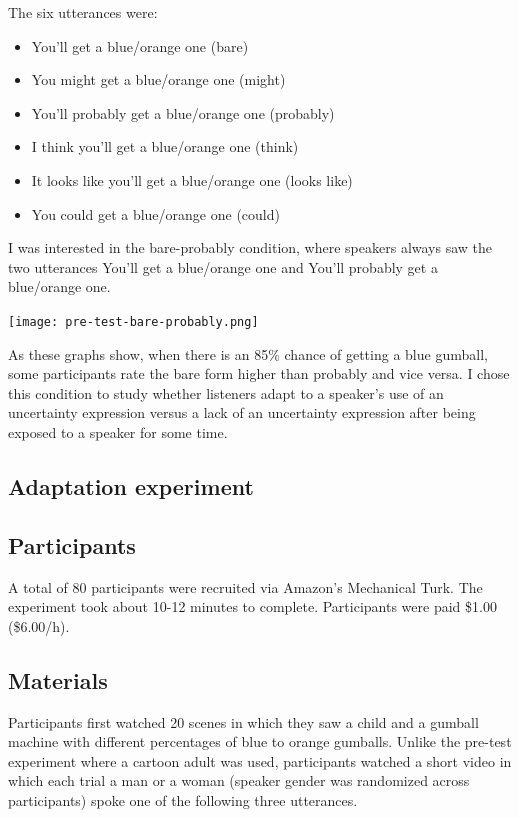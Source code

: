 \documentclass{sp}          %
\begin{document}
The six utterances were:

\begin{itemize}
\item You’ll get a blue/orange one (bare)
\item You might get a blue/orange one (might)
\item You’ll probably get a blue/orange one (probably)
\item I think you’ll get a blue/orange one (think)
\item It looks like you’ll get a blue/orange one (looks like) 
\item You could get a blue/orange one (could) 
\end{itemize}

I was interested in the bare-probably condition, where speakers always saw the two utterances You’ll get a blue/orange one and You’ll probably get a blue/orange one. 

\begin{center}
\texttt{[image: pre-test-bare-probably.png]}
\end{center}

As these graphs show, when there is an 85\% chance of getting a blue gumball, some participants rate the bare form higher than probably and vice versa. I chose this condition to study whether listeners adapt to a speaker’s use of an uncertainty expression versus a lack of an uncertainty expression after being exposed to a speaker for some time. 

\subsection{Adaptation experiment}

\subsection{Participants}
A total of 80 participants were recruited via Amazon’s Mechanical Turk. The experiment took about 10-12 minutes to complete. Participants were paid \$1.00 (\$6.00/h).

\subsection{Materials}


Participants first watched 20 scenes in which they saw a child and a gumball machine with different percentages of blue to orange gumballs. Unlike the pre-test experiment where a cartoon adult was used, participants watched a short video in which each trial a man or a woman (speaker gender was randomized across participants) spoke one of the following three utterances.
\end{document}
